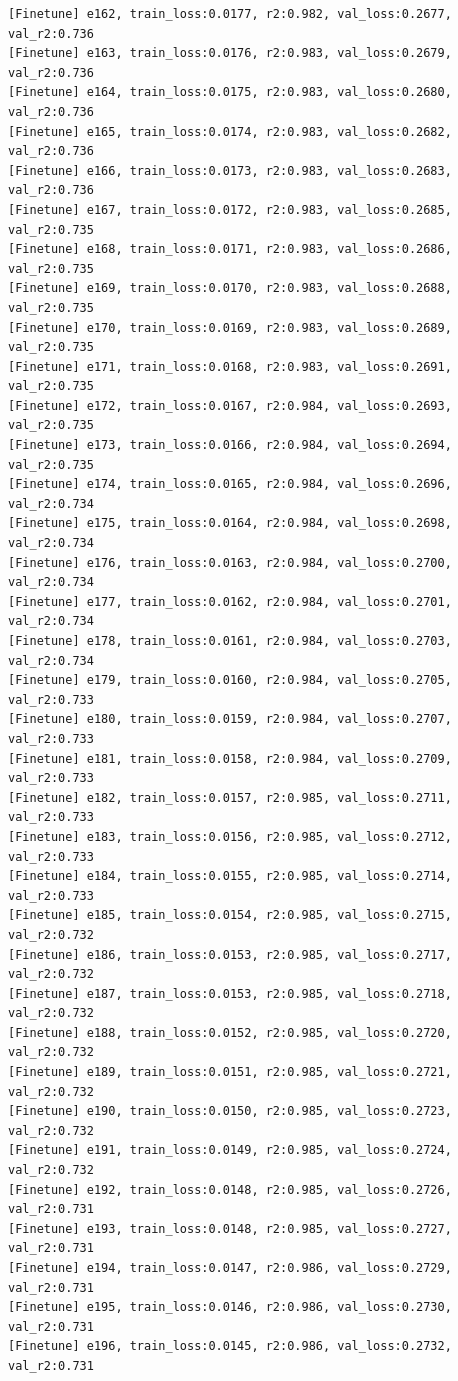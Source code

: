 \documentclass[a4paper, 12pt]{article}
\begin{document}
\begin{lstlisting}
[Finetune] e162, train_loss:0.0177, r2:0.982, val_loss:0.2677, val_r2:0.736
[Finetune] e163, train_loss:0.0176, r2:0.983, val_loss:0.2679, val_r2:0.736
[Finetune] e164, train_loss:0.0175, r2:0.983, val_loss:0.2680, val_r2:0.736
[Finetune] e165, train_loss:0.0174, r2:0.983, val_loss:0.2682, val_r2:0.736
[Finetune] e166, train_loss:0.0173, r2:0.983, val_loss:0.2683, val_r2:0.736
[Finetune] e167, train_loss:0.0172, r2:0.983, val_loss:0.2685, val_r2:0.735
[Finetune] e168, train_loss:0.0171, r2:0.983, val_loss:0.2686, val_r2:0.735
[Finetune] e169, train_loss:0.0170, r2:0.983, val_loss:0.2688, val_r2:0.735
[Finetune] e170, train_loss:0.0169, r2:0.983, val_loss:0.2689, val_r2:0.735
[Finetune] e171, train_loss:0.0168, r2:0.983, val_loss:0.2691, val_r2:0.735
[Finetune] e172, train_loss:0.0167, r2:0.984, val_loss:0.2693, val_r2:0.735
[Finetune] e173, train_loss:0.0166, r2:0.984, val_loss:0.2694, val_r2:0.735
[Finetune] e174, train_loss:0.0165, r2:0.984, val_loss:0.2696, val_r2:0.734
[Finetune] e175, train_loss:0.0164, r2:0.984, val_loss:0.2698, val_r2:0.734
[Finetune] e176, train_loss:0.0163, r2:0.984, val_loss:0.2700, val_r2:0.734
[Finetune] e177, train_loss:0.0162, r2:0.984, val_loss:0.2701, val_r2:0.734
[Finetune] e178, train_loss:0.0161, r2:0.984, val_loss:0.2703, val_r2:0.734
[Finetune] e179, train_loss:0.0160, r2:0.984, val_loss:0.2705, val_r2:0.733
[Finetune] e180, train_loss:0.0159, r2:0.984, val_loss:0.2707, val_r2:0.733
[Finetune] e181, train_loss:0.0158, r2:0.984, val_loss:0.2709, val_r2:0.733
[Finetune] e182, train_loss:0.0157, r2:0.985, val_loss:0.2711, val_r2:0.733
[Finetune] e183, train_loss:0.0156, r2:0.985, val_loss:0.2712, val_r2:0.733
[Finetune] e184, train_loss:0.0155, r2:0.985, val_loss:0.2714, val_r2:0.733
[Finetune] e185, train_loss:0.0154, r2:0.985, val_loss:0.2715, val_r2:0.732
[Finetune] e186, train_loss:0.0153, r2:0.985, val_loss:0.2717, val_r2:0.732
[Finetune] e187, train_loss:0.0153, r2:0.985, val_loss:0.2718, val_r2:0.732
[Finetune] e188, train_loss:0.0152, r2:0.985, val_loss:0.2720, val_r2:0.732
[Finetune] e189, train_loss:0.0151, r2:0.985, val_loss:0.2721, val_r2:0.732
[Finetune] e190, train_loss:0.0150, r2:0.985, val_loss:0.2723, val_r2:0.732
[Finetune] e191, train_loss:0.0149, r2:0.985, val_loss:0.2724, val_r2:0.732
[Finetune] e192, train_loss:0.0148, r2:0.985, val_loss:0.2726, val_r2:0.731
[Finetune] e193, train_loss:0.0148, r2:0.985, val_loss:0.2727, val_r2:0.731
[Finetune] e194, train_loss:0.0147, r2:0.986, val_loss:0.2729, val_r2:0.731
[Finetune] e195, train_loss:0.0146, r2:0.986, val_loss:0.2730, val_r2:0.731
[Finetune] e196, train_loss:0.0145, r2:0.986, val_loss:0.2732, val_r2:0.731

\end{lstlisting}
\end{document}
